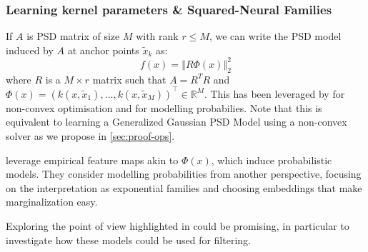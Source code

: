 \subsubsection{Learning kernel parameters \& Squared-Neural Families} If $A$ is PSD matrix of size $M$ with rank $r \leq M$, we can write the PSD model induced by $A$ at anchor points $\tilde x_k$ as:
\begin{equation}
    f(x) = \left\Vert R\Phi(x)\right\Vert_2^2
\end{equation}
where $R$ is a $M \times r$ matrix such that $A = R^T R$ and $\Phi(x) = (k(x, \tilde x_1), \ldots, k(x, \tilde x_M))^\top\in\mathbb R^M$. This has been leveraged by \citet{gaspard} for non-convex optimisation and \citet{squared-neural-families} for modelling probabilies. Note that this is equivalent to learning a Generalized Gaussian PSD Model using a non-convex solver as we propose in \cref{sec:proof-ops}.

\cite{squared-neural-families} leverage empirical feature maps akin to $\Phi(x)$, which induce probabilistic models. They consider modelling probabilities from another perspective, focusing on the interpretation as exponential families and choosing embeddings that make marginalization easy.

Exploring the point of view highlighted in \cite{squared-neural-families} could be promising, in particular to investigate how these models could be used for filtering.
